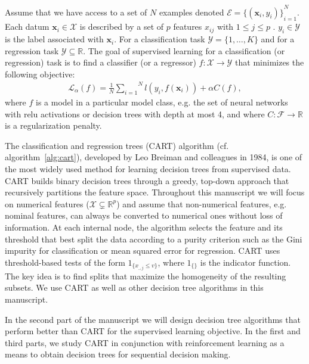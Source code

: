 \begin{definition}\label{def:sl}
    Assume that we have access to a set of $N$ examples denoted $\mathcal{E} = {\{(\boldsymbol{x}_i, y_i)\}}_{i=1}^N$. Each datum $\boldsymbol{x}_i \in \mathcal{X}$ is described by a set of $p$ features $x_{ij}$ with $1\leq j \leq p $ . $y_i \in {\mathcal Y}$ is the label associated with $\boldsymbol{x}_i$.
    For a classification task $\mathcal{Y}=\{1,\ldots,K\}$ and for a regression task $\mathcal{Y}\subseteq \mathbb{R}$.
    The goal of supervised learning for a classification (or regression) task is to find a classifier (or a regressor) $f:\mathcal{X} \rightarrow  \mathcal{Y}$ that minimizes the following objective:
    \begin{align}
        \mathcal{L}_{\alpha}(f) = \frac{1}{N}\overset{N}{\underset{i=1}{\sum}}{l}(y_i, f(\boldsymbol{x}_i)) + \alpha C(f),
    \end{align}
    where $f$ is a model in a particular model class, e.g. the set of neural networks with relu activations or decision trees with depth at most 4, and where $C: \mathcal{F} \rightarrow \mathbb{R}$ is a regularization penalty.
    \end{definition}

The classification and regression trees (CART) algorithm \cite{breiman1984classification} (cf. algorithm~\ref{alg:cart}), developed by Leo Breiman and colleagues in 1984, is one of the most widely used method for learning decision trees from supervised data.
CART builds binary decision trees through a greedy, top-down approach that recursively partitions the feature space.
Throughout this manuscript we will focus on numerical features ($\mathcal{X} \subsetneq \mathbb{R}^p$) and assume that non-numerical features, e.g. nominal features, can always be converted to numerical ones without loss of information.
At each internal node, the algorithm selects the feature and its threshold that best split the data according to a purity criterion such as the Gini impurity for classification or mean squared error for regression.
CART uses threshold-based tests of the form $1_{\{x_{\_,j} \leq v\}}$, where $1_{\{\}}$ is the indicator function. 
The key idea is to find splits that maximize the homogeneity of the resulting subsets. 
We use CART as well as other decision tree algorithms in this manuscript.

In the second part of the manuscript we will design decision tree algorithms that perform better than CART for the supervised learning objective.
In the first and third parts, we study CART in conjunction with reinforcement learning as a means to obtain decision trees for sequential decision making.

